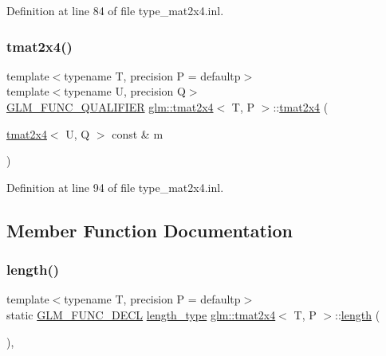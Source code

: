 Definition at line 84 of file type\+\_\+mat2x4.\+inl.

\mbox{\label{structglm_1_1tmat2x4_af1c270415a38eaf9a9d62ebf1e5b5ce4}} 
\subsubsection{\texorpdfstring{tmat2x4()}{tmat2x4()}\hspace{0.1cm}{\footnotesize\ttfamily [22/22]}}
{\footnotesize\ttfamily template$<$typename T, precision P = defaultp$>$ \\
template$<$typename U, precision Q$>$ \\
\mbox{\hyperlink{setup_8hpp_a33fdea6f91c5f834105f7415e2a64407}{G\+L\+M\+\_\+\+F\+U\+N\+C\+\_\+\+Q\+U\+A\+L\+I\+F\+I\+ER}} \mbox{\hyperlink{structglm_1_1tmat2x4}{glm\+::tmat2x4}}$<$ T, P $>$\+::\mbox{\hyperlink{structglm_1_1tmat2x4}{tmat2x4}} (\begin{DoxyParamCaption}\item[{\mbox{\hyperlink{structglm_1_1tmat2x4}{tmat2x4}}$<$ U, Q $>$ const \&}]{m }\end{DoxyParamCaption})}



Definition at line 94 of file type\+\_\+mat2x4.\+inl.



\subsection{Member Function Documentation}
\mbox{\label{structglm_1_1tmat2x4_ad8ebd12c7dd9f888960ac95f375d9701}} 
\subsubsection{\texorpdfstring{length()}{length()}}
{\footnotesize\ttfamily template$<$typename T, precision P = defaultp$>$ \\
static \mbox{\hyperlink{setup_8hpp_ab2d052de21a70539923e9bcbf6e83a51}{G\+L\+M\+\_\+\+F\+U\+N\+C\+\_\+\+D\+E\+CL}} \mbox{\hyperlink{structglm_1_1tmat2x4_a8d8156b982138c22047082ca7a8f9009}{length\+\_\+type}} \mbox{\hyperlink{structglm_1_1tmat2x4}{glm\+::tmat2x4}}$<$ T, P $>$\+::\mbox{\hyperlink{glad_8h_a1499969c13207ed8ab6f796685d4933f}{length}} (\begin{DoxyParamCaption}{ }\end{DoxyParamCaption})\hspace{0.3cm}{\ttfamily [inline]}, {\ttfamily [static]}}



